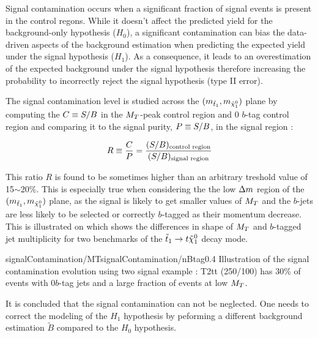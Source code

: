        Signal contamination occurs when a significant fraction of signal events is present in
        the control regons. While it doesn't affect the predicted yield for the background-only hypothesis
        ($H_0$), a significant contamination can bias the data-driven aspects of the background
        estimation when predicting the expected yield under the signal hypothesis ($H_1$). As a
        consequence, it leads to an overestimation of the expected background under the signal hypothesis
        therefore increasing the probability to incorrectly reject the signal hypothesis (type II error).

        The signal contamination level is studied across the $(m_{\tilde{t}_1},m_{\tilde{\chi}_1^0})$
        plane by computing the $C \equiv S/B$ in the $M_T$-peak control region and 0 $b$-tag
        control region and comparing it to the signal purity, $P \equiv S/B$, in the signal region :

        \begin{equation}
            R \equiv \frac{C}{P} = \frac{(S/B)_\text{control region}}{(S/B)_\text{signal region}}
            \label{eq:contaminationRatio}
        \end{equation}

        This ratio $R$ is found to be sometimes higher than an arbitrary treshold value of 15$\sim$20\%.
        This is especially true when considering the the low $\Delta m$ region of the $(m_{\tilde{t}_1},
        m_{\tilde{\chi}_1^0})$ plane, as the signal is likely to get smaller values of $M_T$ and the $b$-jets
        are less likely to be selected or correctly $b$-tagged as their momentum decrease. This is illustrated
        on  which shows the differences in shape of $M_T$ and
        $b$-tagged jet multiplicity for two benchmarks of the $\tilde{t}_1 \rightarrow t \tilde{\chi}_1^0$ decay mode.

                         {signalContamination/MT}{signalContamination/nBtag}{0.4}
                         {Illustration of the signal contamination evolution using two signal example :
                         T2tt (250/100) has 30\% of events with 0$b$-tag jets and a large fraction of events at low $M_T$.}

        It is concluded that the signal contamination can not be neglected. One needs to correct the modeling
        of the $H_1$ hypothesis by peforming a different background estimation $\tilde{B}$ compared to the
        $H_0$ hypothesis.

